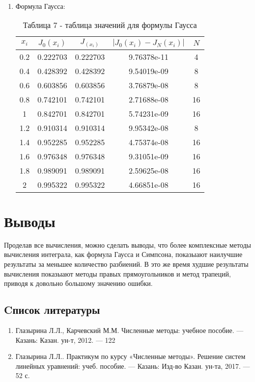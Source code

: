 \documentclass[a4paper,12pt]{article}
\begin{document}
{\begin{enumerate}[label = \arabic*.]
    \item {Формула Гаусса:
        \begin{table}[h]
          \centering
          \begin{tabular}{|c|c|c|c|c|}
            \hline
            $x_i$ & $J_0(x_i)$ & $J_(x_i)$ & $\left|J_0(x_i) - J_N(x_i)\right|$ & $N$\\
            \hline
            0.2 &  0.222703 &  0.222703 & 9.76378e-11 & 4\\
            \hline
            0.4 &  0.428392 &  0.428392 & 9.54019e-09 & 8\\
            \hline
            0.6 &  0.603856 &  0.603856 & 3.76879e-08 & 8\\
            \hline
            0.8 &  0.742101 &  0.742101 & 2.71688e-08 & 16\\
            \hline
            1 &  0.842701 &  0.842701 & 5.74231e-09 & 16\\
            \hline
            1.2 &  0.910314 &  0.910314 & 9.95342e-08 & 8\\
            \hline
            1.4 &  0.952285 &  0.952285 & 4.75374e-08 & 16\\
            \hline
            1.6 &  0.976348 &  0.976348 & 9.31051e-09 & 16\\
            \hline
            1.8 &  0.989091 &  0.989091 & 2.59625e-08 & 16\\
            \hline
            2 &  0.995322 &  0.995322 & 4.66851e-08 & 16\\
            \hline
          \end{tabular}
          \caption*{\small{Таблица 7 - таблица значений для формулы Гаусса}}
        \end{table}
    }
\end{enumerate}
\section{Выводы}
\hspace{1.25cm}Проделав все вычисления, можно сделать выводы, что более комплексные методы вычисления интеграла, как формула Гаусса и Симпсона, показыают наилучшие результа\-ты за меньшее количество разбиений. В это же время худшие результаты вычисления показыают методы правых прямоугольников и метод трапеций, приводя к довольно большому значению ошибки.}
\newpage

\begin{center}
\section{Cписок литературы}
\end{center}
\begin{enumerate}
    \item Глазырина Л.Л., Карчевский М.М. Численные методы: учебное пособие. — Казань: Казан.
    ун-т, 2012. — 122 
    \item Глазырина Л.Л.. Практикум по курсу «Численные методы». Решение
    систем линейных уравнений: учеб. пособие. — Казань: Изд-во Казан. ун-та, 2017. — 52 с.
\end{enumerate}
\newpage
\end{document}
